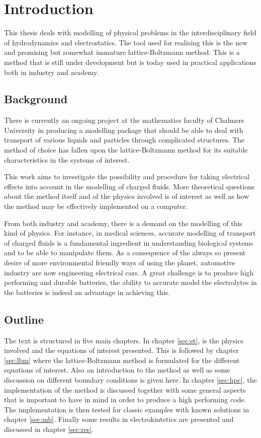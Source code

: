 \chapter{Introduction}
This thesis deals with modelling of physical problems in the
interdisciplinary field of hydrodynamics and electrostatics. The tool
used for realising this is the new and promising but somewhat immature
lattice-Boltzmann method. This is a method that is still under
development but is today used in practical applications both in
industry and academy.

\section{Background}

There is currently an ongoing project at the mathematics faculty of
Chalmers University in producing a modelling package that
should be able to deal with transport of various liquids and particles
through complicated structures. The method of choice has fallen upon
the lattice-Boltzmann method for its suitable characteristics in the
systems of interest. 

This work aims to investigate the possibility and procedure for taking
electrical effects into account in the modelling of charged
fluids. More theoretical questions about the method itself and of the
physics involved is of interest as well as how the method may be
effectively implemented on a computer.

From both industry and academy, there is a demand on the modelling of
this kind of physics. For instance, in medical sciences, accurate
modelling of transport of charged fluids is a fundamental ingredient
in understanding biological systems and to be able to manipulate
them. As a consequence of the always so present desire of more
environmental friendly ways of using the planet, automotive industry
are now engineering electrical cars. A great challenge is to produce
high performing and durable batteries, the ability to accurate
model the electrolytes in the batteries is indeed an advantage in
achieving this. 

\section{Outline}
The text is structured in five main chapters. In chapter \ref{sec:et},
is the physics involved and the equations of interest presented. This
is followed by chapter \ref{sec:lbm} where the lattice-Boltzmann
method is formulated for the different equations of interest. Also an
introduction to the method as well as some discussion on different
boundary conditions is given here. In chapter \ref{sec:hpc}, the
implementation of the method is discussed together with some general
aspects that is important to have in mind in order to produce a high
performing code. The implementation is then tested for classic
examples with known solutions in chapter \ref{sec:mb}. Finally some
results in electrokintetics are presented and discussed in chapter
\ref{sec:res}. 


